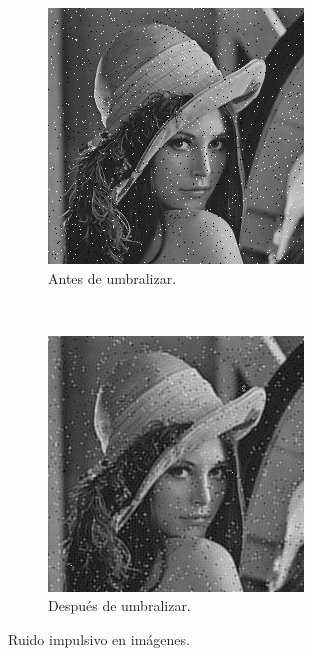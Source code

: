 \documentclass[a4paper,10pt,twoside]{article}
\begin{document}
\begin{figure}[H]
  \centering
  \begin{subfigure}[b]{0.45\textwidth}
    \centering
    \includegraphics[width=\textwidth]{graficos/lena_impulsivo_muestra.png}    
    \caption{Antes de umbralizar.}
  \end{subfigure}
  ~ 
  \begin{subfigure}[b]{0.45\textwidth}
    \centering
    \includegraphics[width=\textwidth]{graficos/lena_impulsivo_umbralizar_muestra.png}
    \caption{Después de umbralizar.}
  \end{subfigure}
  \caption{Ruido impulsivo en imágenes.}
\end{figure}
\end{document}
